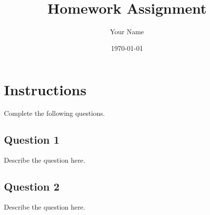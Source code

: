 \documentclass[a4paper,12pt]{article}
\title{Homework Assignment}
\author{Your Name}
\date{\today}
\begin{document}
\maketitle

\section*{Instructions}
Complete the following questions.

\subsection{Question 1}
Describe the question here.

\subsection{Question 2}
Describe the question here.
\end{document}
